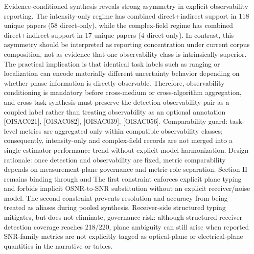 {}Evidence-conditioned synthesis reveals strong asymmetry in explicit observability reporting. The intensity-only regime has combined direct+indirect support in 118 unique papers (58 direct-only), while the complex-field regime has combined direct+indirect support in 17 unique papers (4 direct-only). In contrast, this asymmetry should be interpreted as reporting concentration under current corpus composition, not as evidence that one observability class is intrinsically superior. The practical implication is that identical task labels such as ranging or localization can encode materially different uncertainty behavior depending on whether phase information is directly observable. Therefore, observability conditioning is mandatory before cross-medium or cross-algorithm aggregation, and cross-task synthesis must preserve the detection-observability pair as a coupled label rather than treating observability as an optional annotation [O\markdownRendererUnderscore{}ISAC\markdownRendererUnderscore{}021], [O\markdownRendererUnderscore{}ISAC\markdownRendererUnderscore{}082], [O\markdownRendererUnderscore{}ISAC\markdownRendererUnderscore{}039], [O\markdownRendererUnderscore{}ISAC\markdownRendererUnderscore{}056].\markdownRendererParagraphSeparator
{}Comparability guard: task-level metrics are aggregated only within compatible observability classes; consequently, intensity-only and complex-field records are not merged into a single estimator-performance trend without explicit model harmonization.\markdownRendererInterblockSeparator
{}
\markdownRendererSectionEnd \markdownRendererSectionBegin
{}\markdownRendererInterblockSeparator
{}Design rationale: once detection and observability are fixed, metric comparability depends on measurement-plane governance and metric-role separation. Section II remains binding through\markdownRendererSoftLineBreak
{}\markdownRendererSoftLineBreak
{}and\markdownRendererSoftLineBreak
{}\markdownRendererSoftLineBreak
{}The first constraint enforces explicit plane typing and forbids implicit OSNR-to-SNR substitution without an explicit receiver/noise model. The second constraint prevents resolution and accuracy from being treated as aliases during pooled synthesis.\markdownRendererParagraphSeparator
{}Receiver-side structured typing mitigates, but does not eliminate, governance risk: although structured receiver-detection coverage reaches 218/220, plane ambiguity can still arise when reported SNR-family metrics are not explicitly tagged as optical-plane or electrical-plane quantities in the narrative or tables.\markdownRendererParagraphSeparator
